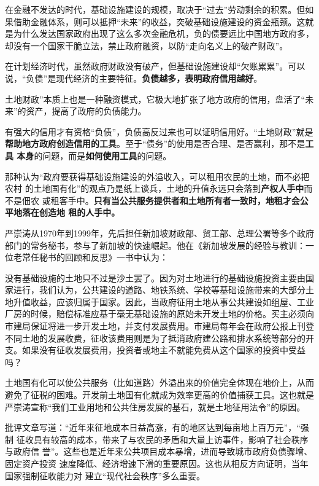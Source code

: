 在金融不发达的时代，基础设施建设的规模，取决于“过去”劳动剩余的积累。但如果借助金融体系，则可以抵押“未来”的收益，突破基础设施建设的资金瓶颈。这就是为什么发达国家政府出现了这么多次金融危机，负的债要远比中国地方政府多，却没有一个国家干脆立法，禁止政府融资，以防“走向名义上的破产财政”。

在计划经济时代，虽然政府财政没有破产，但基础设施建设却“欠账累累”。可以说，“负债”是现代经济的主要特征。\textbf{负债越多，表明政府信用越好}。

土地财政”本质上也是一种融资模式，它极大地扩张了地方政府的信用，盘活了“未来”的资产，提高了政府的负债能力。

有强大的信用才有资格“负债”，负债高反过来也可以证明信用好。“土地财政”就是
\textbf{帮助地方政府创造信用的工具}。至于“债务”的使用是否合理、是否赢利，那不是\textbf{工具
本身}的问题，而是\textbf{如何使用工具}的问题。


那种认为“政府要获得基础设施建设的外溢收入，可以租用农民的土地，而不必把农村
的土地国有化”的观点乃是纸上谈兵，土地的升值永远只会落到\textbf{产权人手中}而不是佃农
或租客手中。\textbf{只有当公共服务提供者和土地所有者一致时，地租才会公平地落在创造地
租的人手中。}

严崇涛从1970年到1999年，先后担任新加坡财政部、贸工部、总理公署等多个政府部门的常务秘书，参与了新加坡的快速崛起。他在《新加坡发展的经验与教训：一位老常任秘书的回顾和反思》一书中认为：

没有基础设施的土地只不过是沙土罢了。因为对土地进行的基础设施投资主要由国家进行，我们认为，公共建设的道路、地铁系统、学校等基础设施带来的大部分土地升值收益，应该归属于国家。因此，当政府征用土地从事公共建设如组屋、工业厂房的时候，赔偿标准应基于毫无基础设施的原始未开发土地的价格。买主必须向市建局保证将进一步开发土地，并支付发展费用。市建局每年会在政府公报上刊登不同土地的发展收费，征收该费用则是为了抵消政府建公路和排水系统等部分的开支。如果没有征收发展费用，投资者或地主不就能免费从这个国家的投资中受益吗？

土地国有化可以使公共服务（比如道路）外溢出来的价值完全体现在地价上，从而避免了征税的困难。开发前土地国有化就成为效率更高的价值捕获工具。这也就是严崇涛宣称“我们工业用地和公共住房发展的基石，就是土地征用法令”的原因。

批评文章写道：“近年来征地成本日益高涨，有的地区达到每亩地上百万元”，“强制
征收具有较高的成本，带来了与农民的矛盾和大量上访事件，影响了社会秩序与政府信
誉”。这些也是近年来公共项目成本暴增，进而导致城市政府负债骤增、固定资产投资
速度降低、经济增速下滑的重要原因。这也从相反方向证明，当年国家强制征收能力对
建立“现代社会秩序”多么重要。

